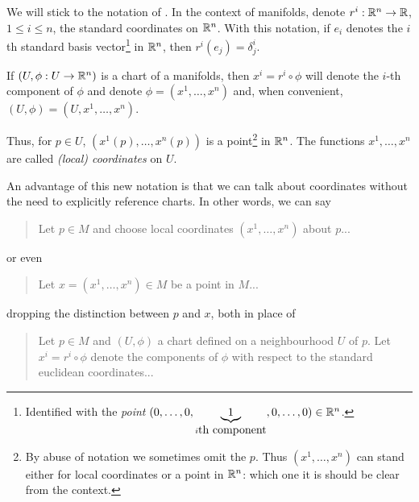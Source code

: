 \vspace{1em}
\begin{notation}\label{ntn:coords}
  We will stick to the notation of \cite{book:tu}.
  In the context of manifolds, denote $r^i: \mathbb{R}^n\to\mathbb{R}$, $1\leq i\leq n$, the standard coordinates on $\mathbb{R}^n$.
  With this notation, if $e_i$ denotes the $i$th standard basis vector\footnote{Identified with the \emph{point} $(0,\ldots,0,\LaTeXunderbrace{1}_{i\mbox{th component}},0,\ldots,0) \in\R^n$.} in $\mathbb{R}^n$, then $r^i(e_j) = \delta^i_j$.

  If $(U, \phi:U\to\mathbb{R}^n)$ is a chart of a manifolds, then $x^i = r^i\circ\phi$ will denote the $i$-th component of $\phi$ and denote $\phi = (x^1, \ldots, x^n)$ and, when convenient, $(U,\phi) = (U, x^1, \ldots, x^n)$.

  Thus, for $p\in U$, $(x^1(p), \ldots, x^n(p))$ is a point\footnote{By abuse of notation we sometimes omit the $p$. 
  Thus $(x^1, \ldots, x^n)$ can stand either for local coordinates or a point in $\mathbb{R}^n$: which one it is should be clear from the context.} in $\mathbb{R}^n$.
  The functions $x^1, \ldots, x^n$  are called \emph{(local) coordinates} on $U$.
\end{notation}
\vspace{1em}

An advantage of this new notation is that we can talk about coordinates without the need to explicitly reference charts. In other words, we can say
\begin{quote}
  Let $p\in M$ and choose local coordinates $(x^1, \ldots, x^n)$ about $p$...
\end{quote}
or even
\begin{quote}
  Let $x=(x^1, \ldots, x^n)\in M$ be a point in $M$...
\end{quote}
dropping the distinction between $p$ and $x$, both in place of
\begin{quote}
  Let $p \in M$ and $(U, \phi)$ a chart defined on a neighbourhood $U$ of $p$.
  Let $x^i = r^i \circ\phi$ denote the components of $\phi$ with respect to the standard euclidean coordinates...
\end{quote}

